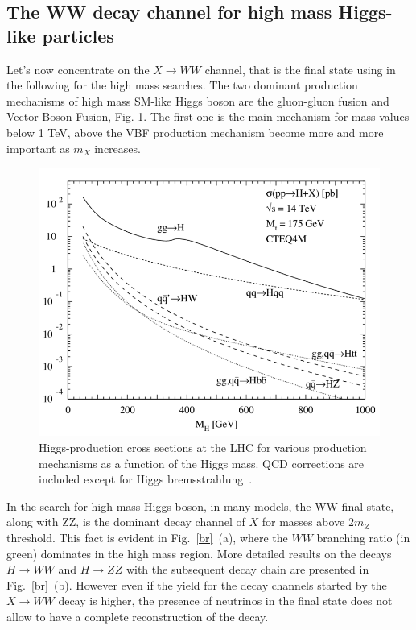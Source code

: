 \subsection*{The WW decay channel for high mass Higgs-like particles}
Let’s now concentrate on the $X \to WW$ channel, that is the  final state using in the following  for the high mass searches.
The two dominant production mechanisms of high mass SM-like Higgs boson are the
gluon-gluon fusion and Vector Boson Fusion,  Fig. \ref{prod}. 
The first one is the main mechanism for mass values below 1 TeV, above the VBF production mechanism become more and more important as $m_X$ increases.
\begin{figure}
\centering
\includegraphics[scale= 0.4]{../Cap1/Higgs-production-cross-sections-at-the-LHC-for-various-production-mechanisms-as-a}
\caption{Higgs-production cross sections at the LHC for various production mechanisms as a function of the Higgs mass. QCD corrections are included except for Higgs bremsstrahlung~\cite{Djouadi2004}.}
\label{prod}
\end{figure}
In the search for high mass Higgs boson, in many models, the WW final state, along with ZZ, is the dominant decay channel of $X$ for masses above $2m_Z$ threshold. This fact is evident in Fig.~\ref{br}~(a), where the $WW$ branching ratio (in green) dominates in the high mass region. More detailed results on the decays $H \to WW$ and $H \to ZZ $ with the subsequent decay chain are presented in Fig.~\ref{br}~(b).
However even if the yield for the decay channels started by the $X \to WW$ decay is higher,  the
presence of neutrinos in the final state does not allow to have a complete reconstruction of the decay.
